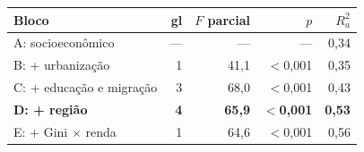 \begin{tabular}{@{}lrrrr@{}}
\toprule
\textbf{Bloco} & \textbf{gl} & \textbf{$F$ parcial} & \textbf{$p$} & \textbf{$R^2_a$}\\
\midrule
A: socioeconômico & --- & --- & --- & 0,34\\
B: + urbanização & 1 & 41,1 & $<$0,001 & 0,35\\
C: + educação e migração & 3 & 68,0 & $<$0,001 & 0,43\\
\rowcolor{fundo}\textbf{D: + região} & \textbf{4} & \textbf{65,9} & \textbf{$<$0,001} & \textbf{0,53}\\
E: + Gini $\times$ renda & 1 & 64,6 & $<$0,001 & 0,56\\
\bottomrule
\end{tabular}
